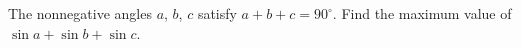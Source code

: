The nonnegative angles $a$, $b$, $c$ satisfy $a+b+c=90^\circ$. Find the maximum value of $\sin a+\sin b+\sin c$.
